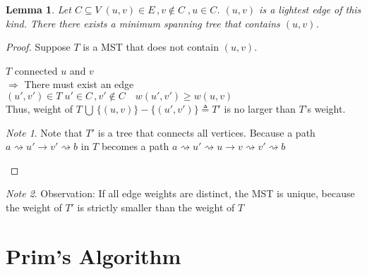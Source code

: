 \documentclass{article}
\theoremstyle{definition}
\theoremstyle{remark}
\newtheorem{note}{Note}[section]
\theoremstyle{plain}
\newtheorem{lem}[thm]{Lemma}
\begin{document}
\begin{lem}
Let $C \subseteq V\; (u,v) \in E\,, v \notin C\;, u \in C$. $(u,v)$ is a lightest edge of this kind.  There there exists a minimum spanning tree that contains $(u,v)$.
\end{lem}
\begin{proof}
Suppose $T$ is a MST that does not contain $(u,v)$.\\


$T$ connected $u$ and $v$\\ 

$\Rightarrow$ There must exist an edge $(u',v') \in T\; u' \in C \,, v' \notin C \quad w(u',v') \ge w(u,v)$\\
Thus, weight of $T \, \bigcup \, \{ (u,v) \} - \{(u', v')\} \triangleq T'$ is no larger than $T$'s weight.

\begin{note}
Note that $T'$ is a tree that connects all vertices.  Because a path $a \rightsquigarrow u' \rightarrow v'  \rightsquigarrow  b$ in $T$ becomes a path $a \rightsquigarrow u'  \rightsquigarrow u \rightarrow v   \rightsquigarrow v' \rightsquigarrow  b$ 
\end{note}
\end{proof}

\begin{note}
Observation: If all edge weights are distinct, the MST is unique, because the weight of $T'$ is strictly smaller than the weight of $T$
\end{note}

\section{Prim's Algorithm}
\end{document}
